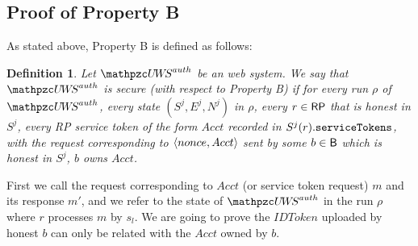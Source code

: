 \documentclass[letterpaper,onecolumn,10pt]{article}
\newtheorem{definition}{Definition}
\begin{document}
\subsection{Proof of Property B}
As stated above, Property B is defined as follows:
\begin{definition}\label{def:B}
  Let $\uppressoauthwebsystem$ be an \uppresso web system. We say that
  \emph{$\uppressoauthwebsystem$ is secure (with respect to Property B)} if
  for every run $\rho$ of $\uppressoauthwebsystem$, every state $(S^j, E^j, N^j)$
  in $\rho$, every $r\in \mathsf{RP}$ that is honest in $S^j$, 
  every RP service token of the form $Acct$ recorded in
  $S^j(r).\mathtt{serviceTokens}$, with the request corresponding to
  $\langle {{}nonce, Acct} \rangle$ sent by some $b\in \mathsf{B}$ which is honest in $S^j$, $b$ owns $Acct$.
\end{definition}

First we call the request corresponding to $Acct$ (or service token request) $m$ and
its response $m'$, and we refer to the state of $\uppressoauthwebsystem$ in the run 
$\rho$ where $r$ processes $m$ by $s_l$. We are going to prove the $IDToken$ uploaded 
by honest $b$ can only be related with the $Acct$ owned by $b$.

\end{document}

